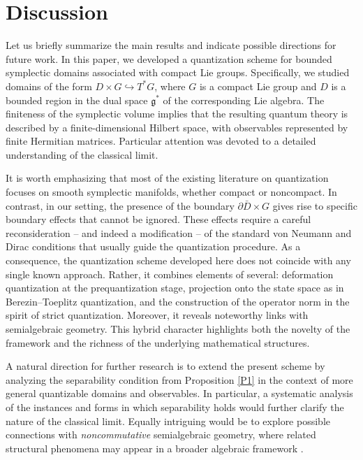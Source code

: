 \documentclass[12pt,a4paper]{article}
\numberwithin{equation}{section}
\theoremstyle{theorem}
\theoremstyle{remark}
\begin{document}
\section{Discussion}

Let us briefly summarize the main results and indicate possible directions for future work. In this paper, we developed a quantization scheme for bounded symplectic domains associated with compact Lie groups. Specifically, we studied domains of the form $D\times G\hookrightarrow T^\ast G$, where $G$ is a compact Lie group and $D$ is a bounded region in the dual space $\mathfrak{g}^\ast$ of the corresponding Lie algebra. The finiteness of the symplectic volume implies that the resulting quantum theory is described by a finite-dimensional Hilbert space, with observables represented by finite Hermitian matrices.
Particular attention was devoted to a detailed understanding of the classical limit.

It is worth emphasizing that most of the existing literature on quantization focuses on smooth symplectic manifolds, whether compact or noncompact. In contrast, in our setting, the presence of the boundary $\partial \bar D \times G$ gives rise to specific boundary effects that cannot be ignored. These effects require a careful reconsideration -- and indeed a modification -- of the standard von Neumann and Dirac conditions that usually guide the quantization procedure.
As a consequence, the quantization scheme developed here does not coincide with any single known approach. Rather, it combines elements of several: deformation quantization at the prequantization stage, projection onto the state space as in Berezin--Toeplitz quantization, and the construction of the operator norm in the spirit of strict quantization. Moreover, it reveals noteworthy links with semialgebraic geometry. This hybrid character highlights both the novelty of the framework and the richness of the underlying mathematical structures. 

A natural direction for further research is to extend the present scheme by analyzing the separability condition from Proposition \ref{P1} in the context of more general quantizable domains and observables. In particular, a systematic analysis of the instances and forms in which separability holds would further clarify the nature of the classical limit. Equally intriguing would be to explore possible connections with {\it noncommutative} semialgebraic geometry, where related structural phenomena may appear in a broader algebraic framework \cite{helton2004positivstellensatz, schmudgen2008noncommutative}.
\end{document}
